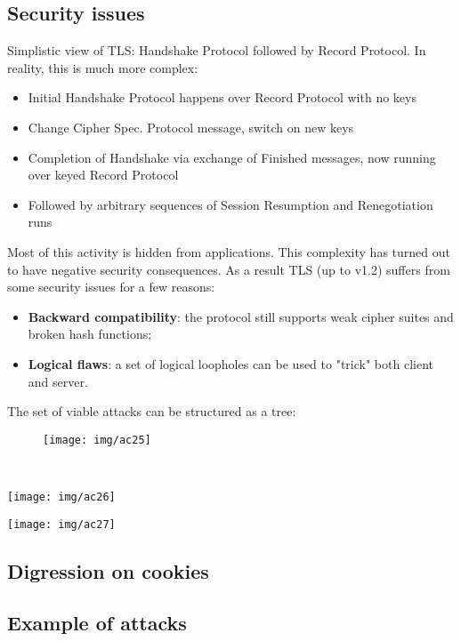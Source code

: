\documentclass[a4paper, 10pt, titlepage]{article}
\begin{document}
\subsection{Security issues}
Simplistic view of TLS: Handshake Protocol followed by Record Protocol. In reality, this is much more complex:
\begin{itemize}
\item Initial Handshake Protocol happens over Record Protocol with no keys
\item Change Cipher Spec. Protocol message, switch on new keys
\item Completion of Handshake via exchange of Finished messages, now running over keyed Record Protocol
\item Followed by arbitrary sequences of Session Resumption and Renegotiation runs
\end{itemize}
Most of this activity is hidden from applications. This complexity has turned out to have negative security consequences. As a result TLS (up to v1.2) suffers from some security issues for a few reasons:
\begin{itemize}
\item \textbf{Backward compatibility}: the protocol still supports weak cipher suites and broken hash functions;
\item \textbf{Logical flaws}: a set of logical loopholes can be used to "trick" both client and server.
\end{itemize}
The set of viable attacks can be structured as a tree:
\begin{figure}[h]
\centering
\texttt{[image: img/ac25]}
\end{figure}\\
\begin{minipage}{0.55\textwidth}
\texttt{[image: img/ac26]}
\end{minipage}
\begin{minipage}{0.35\textwidth}
\texttt{[image: img/ac27]}
\end{minipage}

\subsection{Digression on cookies}

\subsection{Example of attacks}
\end{document}
